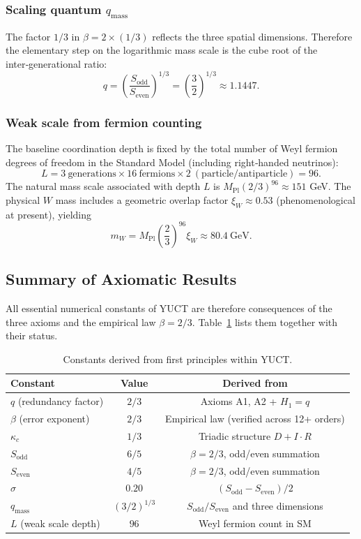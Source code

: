 \documentclass[11pt,a4paper]{article}
\begin{document}
\subsubsection{Scaling quantum \(q_{\text{mass}}\)}
The factor \(1/3\) in \(\beta = 2 \times (1/3)\) reflects the three spatial dimensions. Therefore the elementary step on the logarithmic mass scale is the cube root of the inter‑generational ratio:
\[
\boxed{q = \left(\frac{S_{\mathrm{odd}}}{S_{\mathrm{even}}}\right)^{1/3} = \left(\frac{3}{2}\right)^{1/3} \approx 1.1447}.
\]

\subsubsection{Weak scale from fermion counting}
The baseline coordination depth is fixed by the total number of Weyl fermion degrees of freedom in the Standard Model (including right‑handed neutrinos):
\[
L = 3\ \text{generations} \times 16\ \text{fermions} \times 2\ (\text{particle/antiparticle}) = 96.
\]
The natural mass scale associated with depth \(L\) is \(M_{\mathrm{Pl}} (2/3)^{96} \approx 151\) GeV. The physical \(W\) mass includes a geometric overlap factor \(\xi_W \approx 0.53\) (phenomenological at present), yielding
\[
m_W = M_{\mathrm{Pl}} \left(\frac{2}{3}\right)^{96} \xi_W \approx 80.4\ \text{GeV}.
\]

\subsection{Summary of Axiomatic Results}

All essential numerical constants of YUCT are therefore consequences of the three axioms and the empirical law \(\beta=2/3\). Table~\ref{tab:derived-constants} lists them together with their status.

\begin{table}[H]
	\centering
	\caption{Constants derived from first principles within YUCT.}
	\label{tab:derived-constants}
	\begin{tabular}{l c c}
		\toprule
		\textbf{Constant} & \textbf{Value} & \textbf{Derived from} \\
		\midrule
		\(q\) (redundancy factor) & \(2/3\) & Axioms A1, A2 + \(H_1=q\) \\
		\(\beta\) (error exponent) & \(2/3\) & Empirical law (verified across 12+ orders) \\
		\(\kappa_c\) & \(1/3\) & Triadic structure \(D+I\!\cdot\!R\) \\
		\(S_{\mathrm{odd}}\) & \(6/5\) & \(\beta=2/3\), odd/even summation \\
		\(S_{\mathrm{even}}\) & \(4/5\) & \(\beta=2/3\), odd/even summation \\
		\(\sigma\) & \(0.20\) & \((S_{\mathrm{odd}}-S_{\mathrm{even}})/2\) \\
		\(q_{\text{mass}}\) & \((3/2)^{1/3}\) & \(S_{\mathrm{odd}}/S_{\mathrm{even}}\) and three dimensions \\
		\(L\) (weak scale depth) & \(96\) & Weyl fermion count in SM \\
		\bottomrule
	\end{tabular}
\end{table}
\end{document}
